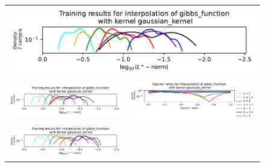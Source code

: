 \documentclass[12pt]{report} %
\begin{document}
\begin{figure}[H]
  \hspace*{-2.8cm}
  \begin{tabular}{rl}
    \multicolumn{2}{c}{{\includegraphics[width=.7\textwidth, trim={0 3.1cm 0 0},clip=true]
    {imagenes/experiments/1d/statistical_1d_full/gibbs_function/linf_gibbs_function_C7_gaussian_kernel.pdf}}}                                                                                       \\
    {\includegraphics[width=.68\textwidth, trim={.58cm 1.25cm 0 1.17cm},clip=true]
    {imagenes/experiments/1d/statistical_1d_full/gibbs_function/linf_gibbs_function_C7_gaussian_kernel.pdf}}  & {\includegraphics[width=.62\textwidth, trim={1cm 2.4cm 2.88cm 1.17cm},clip=true]
    {imagenes/experiments/1d/statistical_1d_full/gibbs_function/epochs_gibbs_function_C7_gaussian_kernel.pdf}}                                                                                      \\
    {\includegraphics[width=.68\textwidth, trim={.58cm 1.25cm 0 1.17cm},clip=true]
    {imagenes/experiments/1d/statistical_1d_full/gibbs_function/linf_gibbs_function_C9_gaussian_kernel.pdf}}  & {\includegraphics[width=.62\textwidth, trim={1cm 2.4cm 2.88cm 1.17cm},clip=true]
}
\end{tabular}
\end{figure}
\end{document}
